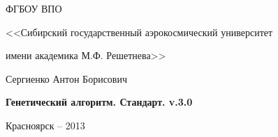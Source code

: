 \thispagestyle{empty}

\begin{center}
ФГБОУ ВПО \par
<<Сибирский государственный аэрокосмический университет \par имени академика М.Ф. Решетнева>>\par 
\par
\end{center}

\vspace{20mm}
%

\vspace{30mm}
\begin{center}
{\large Сергиенко Антон Борисович}
\end{center}

\vspace{5mm}
\begin{center}
{\bf \large Генетический алгоритм. Стандарт. v.3.0
\par}

\vspace{10mm}
%

\vspace{10mm}
%
\end{center}

\vspace{80mm}
%
%
%

\vspace{20mm}
\begin{center}
{Красноярск -- 2013}
\end{center}

\newpage